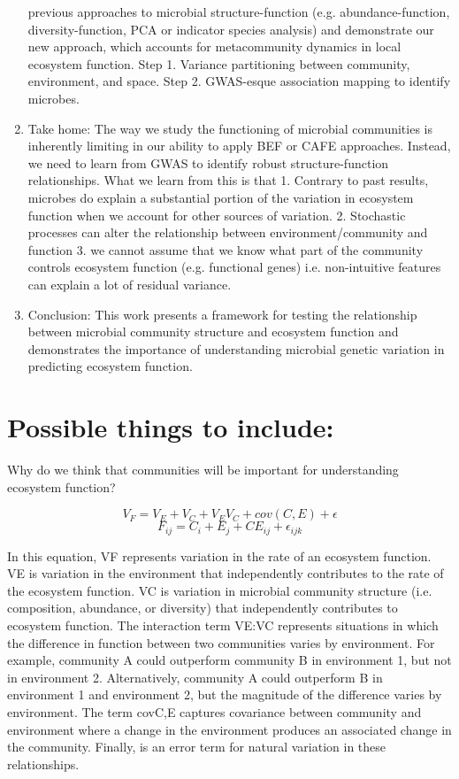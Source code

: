 \documentclass{article}
\begin{document}
\begin{enumerate}
  previous approaches to microbial structure-function (e.g. abundance-function,
  diversity-function, PCA or indicator species analysis) and demonstrate our new
  approach, which accounts for metacommunity dynamics in local ecosystem
  function. Step 1. Variance partitioning between community, environment, and
  space. Step 2. GWAS-esque association mapping to identify microbes.  
  \item Take home: The way we study the functioning of microbial communities is
  inherently limiting in our ability to apply BEF or CAFE approaches. Instead,
  we need to learn from GWAS to identify robust structure-function
  relationships. What we learn from this is that 1. Contrary to past results,
  microbes do explain a substantial portion of the variation in ecosystem
  function when we account for other sources of variation. 2. Stochastic
  processes can alter the relationship between environment/community and
  function 3.  we cannot assume that we know what part of the community controls
  ecosystem function (e.g. functional genes) i.e. non-intuitive features can
  explain a lot of residual variance.  
  \item Conclusion: This work presents a
  framework for testing the relationship between microbial community structure
  and ecosystem function and demonstrates the importance of understanding
  microbial genetic variation in predicting ecosystem function.  
  \end{enumerate}

\section*{Possible things to include:}
Why do we think that communities will be important for understanding ecosystem
function?



\begin{equation}
V_F=V_E+V_C+V_EV_C+cov(C,E)+\epsilon
\end{equation}
\begin{equation}
F_{ij}=C_i+E_j+CE_{ij}+\epsilon_{ijk}
\end{equation}

In this equation, VF represents variation in the rate of an ecosystem function.
VE is variation in the environment that independently contributes to the rate of
the ecosystem function. VC is variation in microbial community structure (i.e.
composition, abundance, or diversity) that independently contributes to
ecosystem function. The interaction term VE:VC represents situations in which
the difference in function between two communities varies by environment. For
example, community A could outperform community B in environment 1, but not in
environment 2. Alternatively, community A could outperform B in environment 1
and environment 2, but the magnitude of the difference varies by environment.
The term covC,E captures covariance between community and environment where a
change in the environment produces an associated change in the community.
Finally,  is an error term for natural variation in these relationships. 
\end{document}
